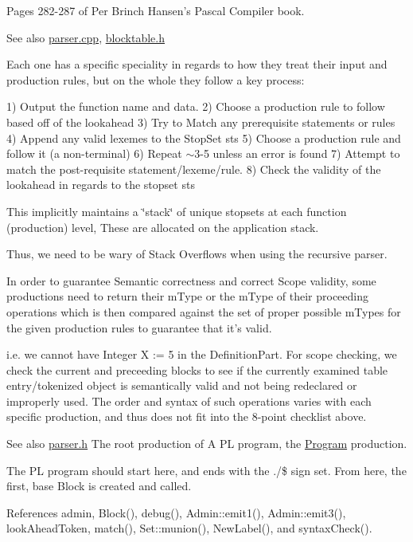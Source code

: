 Pages 282-\/287 of Per Brinch Hansen's Pascal Compiler book.

\begin{DoxySeeAlso}{See also}
\hyperlink{parser_8cpp}{parser.cpp}, \hyperlink{blocktable_8h}{blocktable.h}
\end{DoxySeeAlso}
Each one has a specific speciality in regards to how they treat their input and production rules, but on the whole they follow a key process:

1) Output the function name and data. 2) Choose a production rule to follow based off of the lookahead 3) Try to Match any prerequisite statements or rules 4) Append any valid lexemes to the StopSet sts 5) Choose a production rule and follow it (a non-\/terminal) 6) Repeat $\sim$3-\/5 unless an error is found 7) Attempt to match the post-\/requisite statement/lexeme/rule. 8) Check the validity of the lookahead in regards to the stopset sts

This implicitly maintains a \char`\"{}stack\char`\"{} of unique stopsets at each function (production) level, These are allocated on the application stack.

Thus, we need to be wary of Stack Overflows when using the recursive parser.

In order to guarantee Semantic correctness and correct Scope validity, some productions need to return their mType or the mType of their proceeding operations which is then compared against the set of proper possible mTypes for the given production rules to guarantee that it's valid.

i.e. we cannot have Integer X := 5 in the DefinitionPart. For scope checking, we check the current and preceeding blocks to see if the currently examined table entry/tokenized object is semantically valid and not being redeclared or improperly used. The order and syntax of such operations varies with each specific production, and thus does not fit into the 8-\/point checklist above.

\begin{DoxySeeAlso}{See also}
\hyperlink{parser_8h}{parser.h} The root production of A PL program, the \hyperlink{classParser_a068fd2e519704d6fbaf9c8ecb3469e49}{Program} production.
\end{DoxySeeAlso}
The PL program should start here, and ends with the ./\$ sign set. From here, the first, base Block is created and called. 

References admin, Block(), debug(), Admin::emit1(), Admin::emit3(), lookAheadToken, match(), Set::munion(), NewLabel(), and syntaxCheck().

